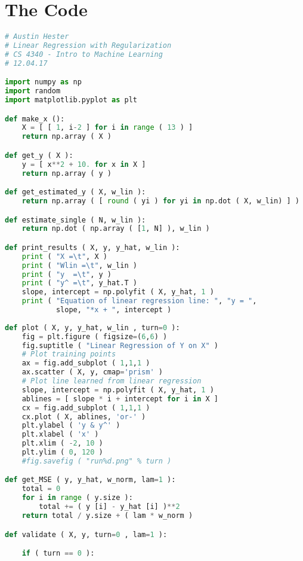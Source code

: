 \documentclass{article}
\begin{document}
\newpage
\section*{The Code}
\lstset{
	frame=tb,
	tabsize=4,
	showstringspaces=false
}
\begin{lstlisting}[language=Python,breaklines=true]
# Austin Hester
# Linear Regression with Regularization
# CS 4340 - Intro to Machine Learning
# 12.04.17

import numpy as np
import random
import matplotlib.pyplot as plt

def make_x ():
    X = [ [ 1, i-2 ] for i in range ( 13 ) ]
    return np.array ( X )

def get_y ( X ):
    y = [ x**2 + 10. for x in X ]
    return np.array ( y )

def get_estimated_y ( X, w_lin ):
    return np.array ( [ round ( yi ) for yi in np.dot ( X, w_lin) ] )

def estimate_single ( N, w_lin ):
    return np.dot ( np.array ( [1, N] ), w_lin )

def print_results ( X, y, y_hat, w_lin ):
    print ( "X =\t", X )
    print ( "Wlin =\t", w_lin )
    print ( "y  =\t", y )
    print ( "y^ =\t", y_hat.T )
    slope, intercept = np.polyfit ( X, y_hat, 1 )
    print ( "Equation of linear regression line: ", "y = ",
            slope, "*x + ", intercept )
    
def plot ( X, y, y_hat, w_lin , turn=0 ):
    fig = plt.figure ( figsize=(6,6) )
    fig.suptitle ( "Linear Regression of Y on X" )
    # Plot training points
    ax = fig.add_subplot ( 1,1,1 )
    ax.scatter ( X, y, cmap='prism' )
    # Plot line learned from linear regression
    slope, intercept = np.polyfit ( X, y_hat, 1 )
    ablines = [ slope * i + intercept for i in X ]
    cx = fig.add_subplot ( 1,1,1 )
    cx.plot ( X, ablines, 'or-' )
    plt.ylabel ( 'y & y^' )
    plt.xlabel ( 'x' )
    plt.xlim ( -2, 10 )
    plt.ylim ( 0, 120 )
    #fig.savefig ( "run%d.png" % turn )

def get_MSE ( y, y_hat, w_norm, lam=1 ):
    total = 0
    for i in range ( y.size ):
        total += ( y [i] - y_hat [i] )**2
    return total / y.size + ( lam * w_norm )

def validate ( X, y, turn=0 , lam=1 ):

    if ( turn == 0 ):
        

\end{lstlisting}
\end{document}
